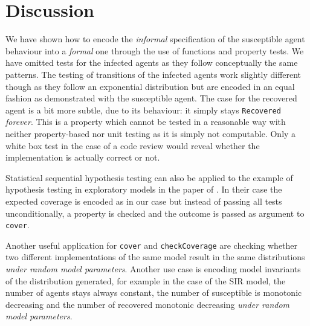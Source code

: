 \section{Discussion}
\label{sec:discussion}
We have shown how to encode the \textit{informal} specification of the susceptible agent behaviour into a \textit{formal} one through the use of functions and property tests. We have omitted tests for the infected agents as they follow conceptually the same patterns. The testing of transitions of the infected agents work slightly different though as they follow an exponential distribution but are encoded in an equal fashion as demonstrated with the susceptible agent. The case for the recovered agent is a bit more subtle, due to its behaviour: it simply stays \texttt{Recovered} \textit{forever}. This is a property which cannot be tested in a reasonable way with neither property-based nor unit testing as it is simply not computable. Only a white box test in the case of a code review would reveal whether the implementation is actually correct or not.
 
Statistical sequential hypothesis testing can also be applied to the example of hypothesis testing in exploratory models in the paper of \cite{thaler_show_2019}. In their case the expected coverage is encoded as in our case but instead of passing all tests unconditionally, a property is checked and the outcome is passed as argument to \texttt{cover}.

Another useful application for \texttt{cover} and \texttt{checkCoverage} are checking whether two different implementations of the same model result in the same distributions \textit{under random model parameters}. Another use case is encoding model invariants of the distribution generated, for example in the case of the SIR model, the number of agents stays always constant, the number of susceptible is monotonic decreasing and the number of recovered monotonic decreasing \textit{under random model parameters}.

%
